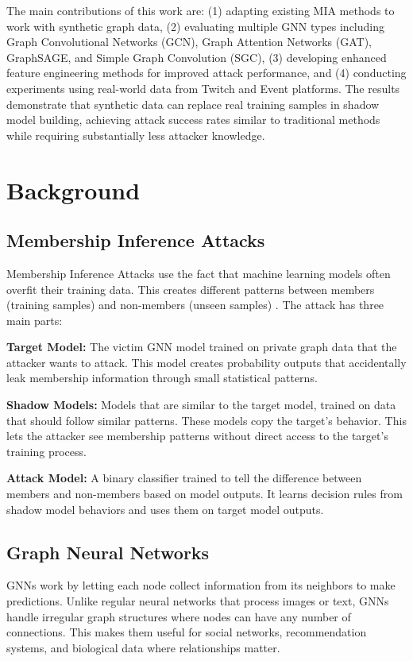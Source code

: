 \documentclass{article}
\begin{document}
The main contributions of this work are: (1) adapting existing MIA methods to work with synthetic graph data, (2) evaluating multiple GNN types including Graph Convolutional Networks (GCN), Graph Attention Networks (GAT), GraphSAGE, and Simple Graph Convolution (SGC), (3) developing enhanced feature engineering methods for improved attack performance, and (4) conducting experiments using real-world data from Twitch and Event platforms. The results demonstrate that synthetic data can replace real training samples in shadow model building, achieving attack success rates similar to traditional methods while requiring substantially less attacker knowledge.

\section{Background}
\subsection{Membership Inference Attacks}
Membership Inference Attacks use the fact that machine learning models often overfit their training data. This creates different patterns between members (training samples) and non-members (unseen samples) \cite{salem2019ml, nasr2019comprehensive}. The attack has three main parts:

\textbf{Target Model:} The victim GNN model trained on private graph data that the attacker wants to attack. This model creates probability outputs that accidentally leak membership information through small statistical patterns.

\textbf{Shadow Models:} Models that are similar to the target model, trained on data that should follow similar patterns. These models copy the target's behavior. This lets the attacker see membership patterns without direct access to the target's training process.

\textbf{Attack Model:} A binary classifier trained to tell the difference between members and non-members based on model outputs. It learns decision rules from shadow model behaviors and uses them on target model outputs.

\subsection{Graph Neural Networks}
GNNs work by letting each node collect information from its neighbors to make predictions. Unlike regular neural networks that process images or text, GNNs handle irregular graph structures where nodes can have any number of connections. This makes them useful for social networks, recommendation systems, and biological data where relationships matter.
\end{document}
